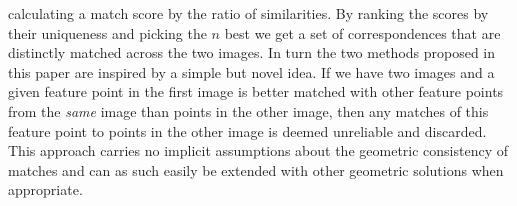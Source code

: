 \documentclass[12pt,journal,compsoc]{IEEEtran}
\begin{document}
calculating a match score by the ratio of similarities. By ranking the 
scores by their uniqueness and picking the $n$ best we get a set of 
correspondences that are distinctly matched across the two images.
%
In turn the two methods proposed in this paper are inspired by a simple 
but novel idea. If we have two images and a given feature point in the 
first image is better matched with other feature points from the 
\emph{same} image than points in the other image, then any matches of 
this feature point to points in the other image is deemed unreliable and 
discarded.  This approach carries no implicit assumptions about the 
geometric consistency of matches and can as such easily be extended with 
other geometric solutions when appropriate.
%
\end{document}
